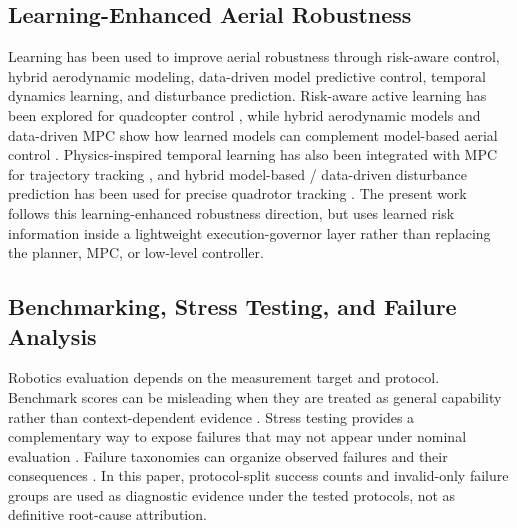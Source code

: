 
\subsection{Learning-Enhanced Aerial Robustness}

Learning has been used to improve aerial robustness through risk-aware control,
hybrid aerodynamic modeling, data-driven model predictive control, temporal
dynamics learning, and disturbance prediction. Risk-aware active learning
has been explored for quadcopter control
\cite{Andersson2017RiskAwareActiveLearning}, while hybrid aerodynamic models
and data-driven MPC show how learned models can complement model-based aerial
control \cite{Bauersfeld2021NeuroBEM,Torrente2021DataDrivenMPC}.
Physics-inspired temporal learning has also been integrated with MPC for
trajectory tracking \cite{Saviolo2022PITCN}, and hybrid model-based /
data-driven disturbance prediction has been used for precise quadrotor
tracking \cite{Lee2024HybridDisturbancePrediction}. The present work follows
this learning-enhanced robustness direction, but uses learned risk information
inside a lightweight execution-governor layer rather than replacing the
planner, MPC, or low-level controller.


\subsection{Benchmarking, Stress Testing, and Failure Analysis}

Robotics evaluation depends on the measurement target and protocol. Benchmark
scores can be misleading when they are treated as general capability rather
than context-dependent evidence
\cite{Muller2019MeasureTargetConfusion}. Stress testing provides a
complementary way to expose failures that may not appear under nominal
evaluation \cite{Koren2018AdaptiveStressTesting,Nalic2020StressTestingScenarioBasedADS}.
Failure taxonomies can organize observed failures and their consequences
\cite{Cameron2024DomesticRobotFailureOutcomes}. In this paper, protocol-split
success counts and invalid-only failure groups are used as diagnostic evidence
under the tested protocols, not as definitive root-cause attribution.

